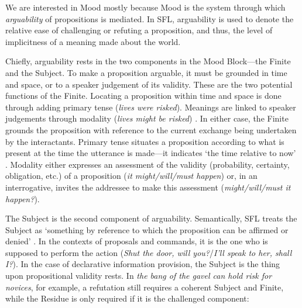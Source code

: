 We are interested in Mood mostly because Mood is the system through which \emph{arguability} of propositions is mediated. In SFL, arguability is used to denote the relative ease of challenging or refuting a proposition, and thus, the level of implicitness of a meaning made about the world.

Chiefly, arguability rests in the two components in the Mood Block---the Finite and the Subject. To make a proposition arguable, it must be grounded in time and space, or to a speaker judgement of its validity. These are the two potential functions of the Finite. Locating a proposition within time and space is done through adding primary tense (\emph{lives were risked}). Meanings are linked to speaker judgements through modality (\emph{lives might be risked}) \cite[p.~116]{halliday_introduction_2004}. In either case, the Finite grounds the proposition with reference to the current exchange being undertaken by the interactants. Primary tense situates a proposition according to what is present at the time the utterance is made---it indicates `the time relative to now' \cite[p.~116]{halliday_introduction_2004}. Modality either expresses an assessment of the validity (probability, certainty, obligation, etc.) of a proposition (\emph{it might/will/must happen}) or, in an interrogative, invites the addressee to make this assessment (\emph{might/will/must it happen?}).

The Subject is the second component of arguability. Semantically, SFL treats the Subject as `something by reference to which the proposition can be affirmed or denied' \cite[p.~117]{halliday_introduction_2004}. In the contexts of proposals and commands, it is the one who is supposed to perform the action (\emph{Shut the door, will you?}/\emph{I'll speak to her, shall I?}). In the case of declarative information provision, the Subject is the thing upon propositional validity rests. In \emph{the bang of the gavel can hold risk for novices}, for example, a refutation still requires a coherent Subject and Finite, while the Residue is only required if it is the challenged component:

